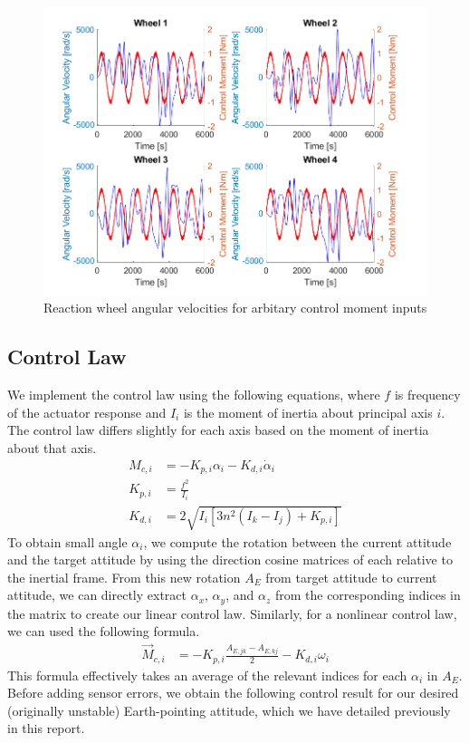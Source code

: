 \begin{figure}[H]
\centering
\includegraphics[scale=0.9]{Images/ps9_problem2.png}
\caption{Reaction wheel angular velocities for arbitary control moment inputs}
\label{fig:ps9_problem2}
\end{figure}

\subsection{Control Law}
We implement the control law using the following equations, where $f$ is frequency of the actuator response and $I_{i}$ is the moment of inertia about principal axis $i$. The control law differs slightly for each axis based on the moment of inertia about that axis.
\begin{align*}
    M_{c,i} &= -K_{p,i} \alpha_{i} - K_{d,i} \Dot{\alpha}_{i} \\
    K_{p,i} &= \frac{f^{2}}{I_{i}} \\
    K_{d,i} &= 2 \sqrt{I_{i} \left[ 3 n^{2} (I_{k} - I_{j}) + K_{p,i} \right]}
\end{align*}
To obtain small angle $\alpha_{i}$, we compute the rotation between the current attitude and the target attitude by using the direction cosine matrices of each relative to the inertial frame. From this new rotation $A_{E}$ from target attitude to current attitude, we can directly extract $\alpha_{x}$, $\alpha_{y}$, and $\alpha_{z}$ from the corresponding indices in the matrix to create our linear control law. Similarly, for a nonlinear control law, we can used the following formula.
\begin{align*}
    \Vec{M}_{c,i} &= -K_{p,i} \frac{A_{E,jk} - A_{E,kj}}{2} - K_{d,i} \omega_{i}
\end{align*}
This formula effectively takes an average of the relevant indices for each $\alpha_{i}$ in $A_{E}$. Before adding sensor errors, we obtain the following control result for our desired (originally unstable) Earth-pointing attitude, which we have detailed previously in this report.

